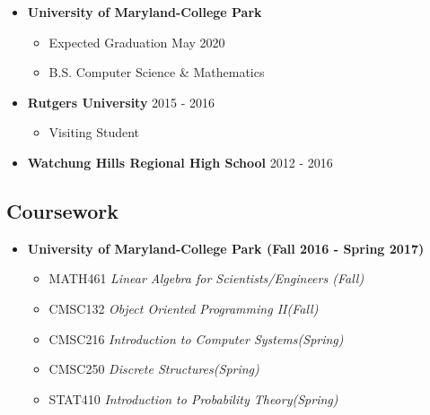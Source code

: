 \documentclass[11pt,letterpaper]{moderncv}
\begin{document}
\begin{itemize}

	\item[]{\textbf{University of Maryland-College Park}}
	\vspace{-8pt}
	\begin{itemize}
		\item[]{{Expected Graduation} \hfill May 2020}
		\vspace{-6pt}
		\item[]{{B.S.} \hfill Computer Science \& Mathematics}
		\vspace{0pt}
	\end{itemize}
	\vspace{-10pt}
	\item[]{\textbf{Rutgers University} \hfill 2015 - 2016}
	\vspace{-8pt}
	\begin{itemize}
		\item[]{Visiting Student}
	\end{itemize}
	\vspace{-10pt}
	\item[]{\textbf{Watchung Hills Regional High School} \hfill 2012 - 2016}
\end{itemize}

\vspace{-12pt}
\subsection{Coursework}
\begin{itemize}
	\item[]{\textbf{University of Maryland-College Park (Fall 2016 - Spring 2017)}}
		\vspace{-8pt}
		\begin{itemize}
			\item[]{{MATH461} \hfill \textit{Linear Algebra for Scientists/Engineers (Fall)}}
			\vspace{-4pt}
			\item[]{{CMSC132} \hfill \textit{Object Oriented Programming II(Fall)}}
			\vspace{-4pt}
			\item[]{CMSC216} \hfill \textit{Introduction to Computer Systems(Spring)}
			\vspace{-4pt}
			\item[]{CMSC250} \hfill \textit{Discrete Structures(Spring)}
			\vspace{-4pt}
			\item[]{{STAT410} \hfill \textit{Introduction to Probability Theory(Spring)}}
			\vspace{0pt}
		\end{itemize}
\end{itemize}
\vspace{-12pt}
\end{document}
